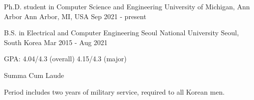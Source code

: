 

\begin{cventries}

  \cventry
    {Ph.D. student in Computer Science and Engineering}
    {University of Michigan, Ann Arbor} %
    {Ann Arbor, MI, USA} %
    {Sep 2021 - present} %
    {
    }
    
  \cventry
    {B.S. in Electrical and Computer Engineering}
    {Seoul National University} %
    {Seoul, South Korea} %
    {Mar 2015 - Aug 2021} %
    {
      \begin{cvitems} %
        \item {GPA: 4.04/4.3 (overall) 4.15/4.3 (major)}
        \item {Summa Cum Laude}
        \item {Period includes two years of military service, required to all Korean men.}
      \end{cvitems}
    }
    
\end{cventries}

